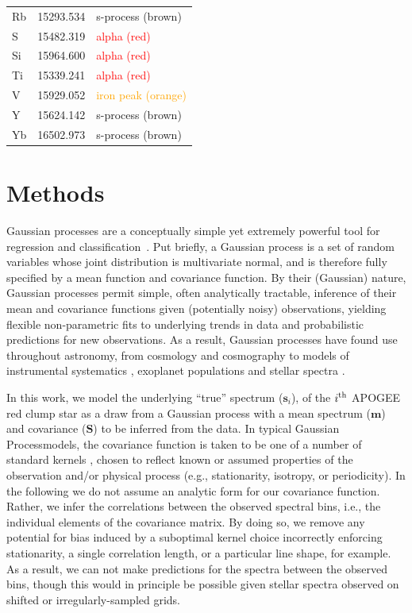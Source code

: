 \documentclass[a4paper,fleqn,usenatbib]{mnras}
\newcommand{\specmean}{{\bm m}}
\newcommand{\speccov}{{\bm S}}
\newcommand{\objspec}{{\bm s}}
\begin{document}
\begin{table}
\begin{tabular}{lcl}
        Rb & 15293.534 & \textcolor{Sepia}{s-process (brown)} \\
        S & 15482.319 & \textcolor{red}{alpha (red)} \\
        Si & 15964.600 & \textcolor{red}{alpha (red)} \\
        Ti & 15339.241 & \textcolor{red}{alpha (red)} \\
        V & 15929.052 & \textcolor{orange}{iron peak (orange)} \\
        Y & 15624.142 & \textcolor{Sepia}{s-process (brown)} \\
        Yb & 16502.973 & \textcolor{Sepia}{s-process (brown)} \\
        \hline
    \end{tabular}
\end{table}


\section{Methods}
\label{sec:methods}

Gaussian processes are a conceptually simple yet extremely powerful tool for regression and classification~\citep{Rasmussen_Williams}. Put briefly, a Gaussian process is a set of random variables whose joint distribution is multivariate normal, and is therefore fully specified by a mean function and covariance function. By their (Gaussian) nature, Gaussian processes permit simple, often analytically tractable, inference of their mean and covariance functions given (potentially noisy) observations, yielding flexible non-parametric fits to underlying trends in data and probabilistic predictions for new observations. As a result, Gaussian processes have found use throughout astronomy, from cosmology \citep{Bond_etal:1987} and cosmography \citep{Shafieloo_etal:2012} to models of instrumental systematics \citep{Gibson_etal:2012}, exoplanet populations \citep{DFM_etal:2014} and stellar spectra \citep{Czekala_etal:2017}.

In this work, we model the underlying ``true'' spectrum ($\objspec_i$), of the $i^{\rm th}$ APOGEE red clump star as a draw from a Gaussian process with a mean spectrum ($\specmean$) and covariance ($\speccov$) to be inferred from the data. In typical Gaussian Processmodels, the covariance function is taken to be one of a number of standard kernels \citep{Rasmussen_Williams}, chosen to reflect known or assumed properties of the observation and/or physical process (e.g., stationarity, isotropy, or periodicity). In the following we do not assume an analytic form for our covariance function. Rather, we infer the correlations between the observed spectral bins, i.e., the individual elements of the covariance matrix. By doing so, we remove any potential for bias induced by a suboptimal kernel choice incorrectly enforcing stationarity, a single correlation length, or a particular line shape, for example. As a result, we can not make predictions for the spectra between the observed bins, though this would in principle be possible given stellar spectra observed on shifted or irregularly-sampled grids.
\end{document}
